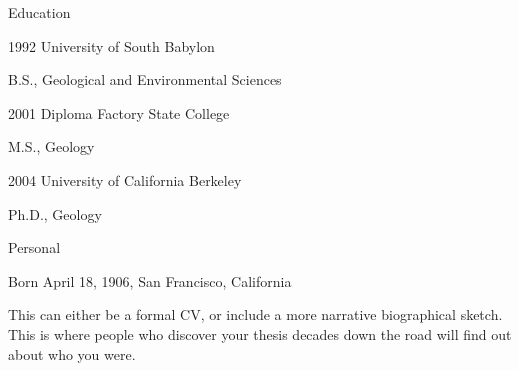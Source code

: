 
\begin{vitaesection}{Education}
\item [1992] University of South Babylon

B.S., Geological and Environmental Sciences

\item [2001] Diploma Factory State College

M.S., Geology

\item [2004] University of California Berkeley

Ph.D., Geology
\end{vitaesection}


\begin{vitaesection}{Personal}
\item [Born] April 18, 1906, 
San Francisco, California
\end{vitaesection}

This can either be a formal CV, or include a more narrative biographical sketch. This is where people who discover your thesis decades down the road will find out about who you were.


